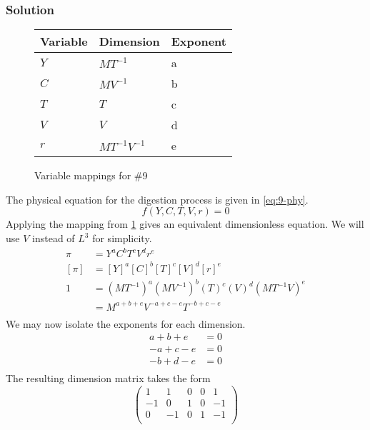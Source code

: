\documentclass[12pt]{article}
\begin{document}
  \subsubsection*{Solution}
  \begin{figure}
    \centering
    \begin{tabularx}{0.5\textwidth}{XXX}
      Variable & Dimension & Exponent \\ \midrule
      $Y$ & $MT^{-1}$ & a \\
      $C$ & $MV^{-1}$ & b \\
      $T$ & $T$ & c \\
      $V$ & $V$ & d \\
      $r$ & $MT^{-1}V^{-1}$ & e \\
    \end{tabularx}
    \caption{Variable mappings for \#9}
\label{fig:9-var-mappings}
  \end{figure}
  The physical equation for the digestion process is given in \cref{eq:9-phy}.
  \begin{equation}
    \label{eq:9-phy}
    f(Y,C,T,V,r)=0
  \end{equation}
  Applying the mapping from \cref{fig:9-var-mappings} gives an equivalent
  dimensionless equation. We will use $V$ instead of $L^3$ for simplicity.
  \begin{equation*}
    \begin{aligned}
      \pi &= {Y}^a {C}^b {T}^c {V}^d {r}^e \\
      [\pi] &= {[Y]}^a {[C]}^b {[T]}^c {[V]}^d {[r]}^e \\
      1 &= {(MT^{-1})}^a {(MV^{-1})}^b {(T)}^c {(V)}^d {(MT^{-1}V)}^e \\
      &= M^{a+b+e}V^{-a+c-e}T^{-b+c-e} \\
    \end{aligned}
  \end{equation*}
  We may now isolate the exponents for each dimension.
  \begin{equation*}
    \begin{aligned}
      a + b + e &= 0 \\
      -a + c - e &= 0 \\
      -b + d - e &= 0 \\
    \end{aligned}
  \end{equation*}
  The resulting dimension matrix takes the form
  \begin{equation*}
    \begin{pmatrix}
      1 & 1 & 0 & 0 & 1 \\
      -1 & 0 & 1 & 0 & -1 \\
      0 & -1 & 0 & 1 & -1 \\
    \end{pmatrix}
  \end{equation*}
\end{document}
